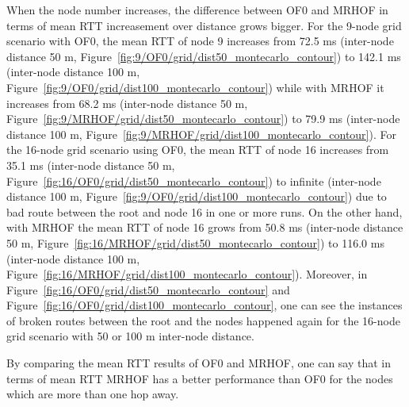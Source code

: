 When the node number increases, the difference between OF0 and MRHOF in terms of mean RTT increasement over distance grows bigger. For the 9-node grid scenario with OF0, the mean RTT of node 9 increases from 72.5 ms (inter-node distance 50 m, Figure~\ref{fig:9/OF0/grid/dist50_montecarlo_contour}) to 142.1 ms (inter-node distance 100 m, Figure~\ref{fig:9/OF0/grid/dist100_montecarlo_contour}) while with MRHOF it increases from 68.2 ms (inter-node distance 50 m, Figure~\ref{fig:9/MRHOF/grid/dist50_montecarlo_contour}) to 79.9 ms (inter-node distance 100 m, Figure~\ref{fig:9/MRHOF/grid/dist100_montecarlo_contour}). For the 16-node grid scenario using OF0, the mean RTT of node 16 increases from 35.1 ms (inter-node distance 50 m, Figure~\ref{fig:16/OF0/grid/dist50_montecarlo_contour}) to infinite (inter-node distance 100 m, Figure~\ref{fig:9/OF0/grid/dist100_montecarlo_contour}) due to bad route between the root and node 16 in one or more runs. On the other hand, with MRHOF the mean RTT of node 16 grows from 50.8 ms (inter-node distance 50 m, Figure~\ref{fig:16/MRHOF/grid/dist50_montecarlo_contour}) to 116.0 ms (inter-node distance 100 m, Figure~\ref{fig:16/MRHOF/grid/dist100_montecarlo_contour}). Moreover, in Figure~\ref{fig:16/OF0/grid/dist50_montecarlo_contour} and Figure~\ref{fig:16/OF0/grid/dist100_montecarlo_contour}, one can see the instances of broken routes between the root and the nodes happened again for the 16-node grid scenario with 50 or 100 m inter-node distance.

By comparing the mean RTT results of OF0 and MRHOF, one can say that in terms of mean RTT MRHOF has a better performance than OF0 for the nodes which are more than one hop away.

